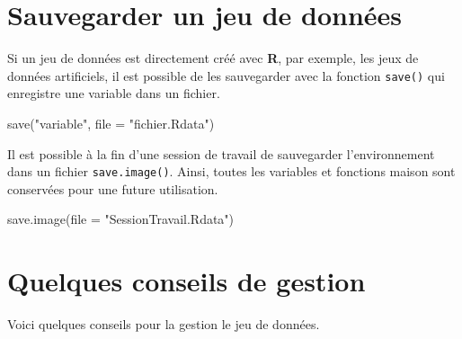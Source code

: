 \documentclass[
]{book}
\newenvironment{Shaded}{}{}
\newcommand{\AttributeTok}[1]{#1}
\newcommand{\FunctionTok}[1]{#1}
\newcommand{\NormalTok}[1]{#1}
\newcommand{\StringTok}[1]{#1}
\begin{document}
\hypertarget{sauvegarder-un-jeu-de-donnuxe9es}{%
\section{Sauvegarder un jeu de données}\label{sauvegarder-un-jeu-de-donnuxe9es}}

Si un jeu de données est directement créé avec \textbf{R}, par exemple, les jeux de données artificiels, il est possible de les sauvegarder avec la fonction \texttt{save()} qui enregistre une variable dans un fichier.

\begin{Shaded}
\begin{Highlighting}[]
\FunctionTok{save}\NormalTok{(}\StringTok{"variable"}\NormalTok{, }\AttributeTok{file =} \StringTok{"fichier.Rdata"}\NormalTok{)}
\end{Highlighting}
\end{Shaded}

Il est possible à la fin d'une session de travail de sauvegarder l'environnement dans un fichier \texttt{save.image()}. Ainsi, toutes les variables et fonctions maison sont conservées pour une future utilisation.

\begin{Shaded}
\begin{Highlighting}[]
\FunctionTok{save.image}\NormalTok{(}\AttributeTok{file =} \StringTok{"SessionTravail.Rdata"}\NormalTok{)}
\end{Highlighting}
\end{Shaded}

\hypertarget{quelques-conseils-de-gestion}{%
\section{Quelques conseils de gestion}\label{quelques-conseils-de-gestion}}

Voici quelques conseils pour la gestion le jeu de données.
\end{document}
